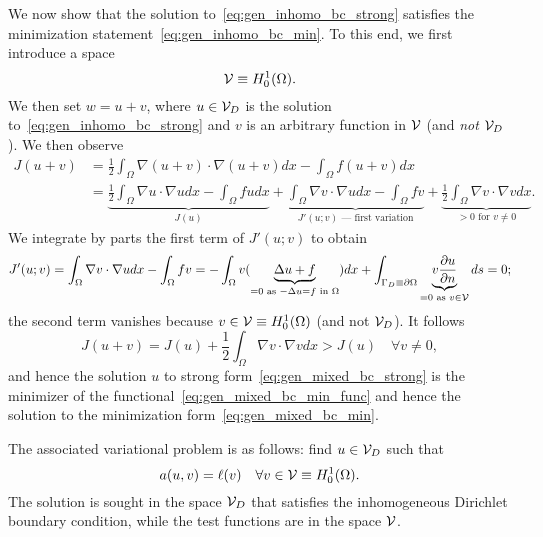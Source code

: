 We now show that the solution to~\eqref{eq:gen_inhomo_bc_strong} satisfies the minimization statement~\eqref{eq:gen_inhomo_bc_min}.  To this end, we first introduce a space
\begin{equation*}
  \calV \equiv H^1_0(\Omega). %
\end{equation*}
We then set $w = u + v$, where $u \in \mathcal{V}_D$ is the solution to~\eqref{eq:gen_inhomo_bc_strong} and $v$ is an arbitrary function in $\mathcal{V}$ (and \emph{not} $\mathcal{V}_D$). We then observe
\begin{align*}
  J(u + v)
  &=
  \frac{1}{2} \int_\Omega \nabla (u + v) \cdot \nabla (u+v) dx - \int_\Omega f (u+v) dx 
  \\
  &= \underbrace{ \frac{1}{2} \int_\Omega \nabla u \cdot \nabla u dx - \int_\Omega fu dx }_{J(u)}
  + \underbrace{\int_{\Omega} \nabla v \cdot \nabla u dx - \int_\Omega f v }_{J'(u;v) \text{ --- first variation}}
  + \underbrace{  \frac{1}{2} \int_{\Omega} \nabla v \cdot \nabla v dx }_{> 0 \text{ for } v \neq 0}.
\end{align*}
We integrate by parts the first term of $J'(u;v)$ to obtain
\begin{equation*}
  J'(u;v) = \int_{\Omega} \nabla v \cdot \nabla u dx - \int_\Omega f v
  = - \int_\Omega v (\underbrace{ \Delta u + f }_{= 0 \text{ as } -\Delta u = f \text{ in } \Omega}) dx + \int_{\Gamma_D \equiv \partial \Omega} \underbrace{ v \frac{\partial u}{\partial n} }_{=0 \text{ as } v \in \mathcal{V}}ds  = 0;
\end{equation*}
the second term vanishes because $v \in \mathcal{V} \equiv H^1_0(\Omega)$ (and not $\mathcal{V}_D$). It follows
\begin{equation*}
  J(u+v) = J(u) + \frac{1}{2} \int_\Omega \nabla v \cdot \nabla v dx > J(u) \quad \forall v \neq 0,
\end{equation*}
and hence the solution $u$ to strong form~\eqref{eq:gen_mixed_bc_strong} is the minimizer of the functional~\eqref{eq:gen_mixed_bc_min_func} and hence the solution to the minimization form~\eqref{eq:gen_mixed_bc_min}.

The associated variational problem is as follows: find $u \in \mathcal{V}_D$ such that
\begin{equation}
  a(u,v) = \ell(v) \quad \forall v \in \mathcal{V} \equiv H^1_0(\Omega).
  \label{eq:gen_inhomo_bc_var}
\end{equation}
The solution is sought in the space $\mathcal{V}_D$ that satisfies the inhomogeneous Dirichlet boundary condition, while the test functions are in the space $\mathcal{V}$.

